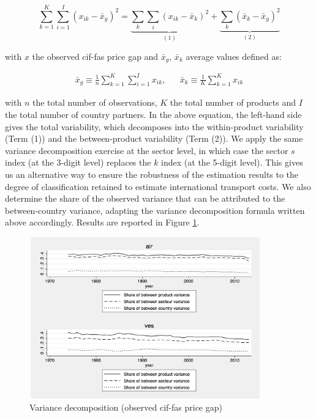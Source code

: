 \documentclass[11pt,twoside, authoryear]{elsarticle}
\begin{document}
$$\sum_{k=1}^K \sum_{i=1}^I \left(x_{ik} - \bar{x}_g  \right)^2 = \underbrace{\sum_k \sum_i \left(x_{ik} - \bar{x}_k  \right)^2}_{(1)} + \underbrace{\sum_k \left(\bar{x}_{k} - \bar{x}_g  \right)^2}_{(2)}$$

with $x$ the observed cif-fas price gap and $\bar{x}_g$, $\bar{x}_k$ average values defined as:

\begin{eqnarray*}
\bar{x}_g \equiv \frac{1}{n} \sum_{k=1}^K \sum_{i=1}^I x_{ik},&& \bar{x}_k \equiv \frac{1}{K}\sum_{k=1}^K x_{ik}
\end{eqnarray*}

\noindent with $n$ the total number of observations, $K$ the total number of products and $I$ the total number of country partners. In the above equation, the left-hand side gives the total variability, which decomposes into the within-product variability (Term (1)) and the between-product variability (Term (2)).
We apply the same variance decomposition exercise at the sector level, in which case the sector $s$ index (at the 3-digit level) replaces the $k$ index (at the 5-digit level).
This gives us an alternative way to ensure the robustness of the estimation results to the degree of classification retained to estimate international transport costs.
We also determine the share of the observed variance that can be attributed to the between-country variance, adapting the variance decomposition formula written above accordingly.
Results are reported in Figure \ref{fig:decomp_variance}.

\begin{figure}[htbp]
\caption{Variance decomposition (observed cif-fas price gap)}
\label{fig:decomp_variance}
\begin{center}
\includegraphics[width=10cm, height=7cm]{variance_decomposition.pdf}
\end{center}
\end{figure}
\end{document}

